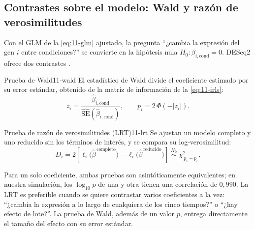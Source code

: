 \subsection{Contrastes sobre el modelo: Wald y razón de verosimilitudes}

Con el GLM de la \cref{eq:11-glm} ajustado, la pregunta ``¿cambia la expresión del gen $i$ entre condiciones?'' se convierte en la hipótesis nula $H_0:\beta_{i,\mathrm{cond}}=0$. DESeq2 ofrece dos contrastes \parencite{c11-love2014}.

\begin{definicion}{Prueba de Wald}{11-wald}
El estadístico de Wald divide el coeficiente estimado por su error estándar, obtenido de la matriz de información de la \cref{eq:11-irls}:
\begin{equation}\label{eq:11-wald}
z_i=\frac{\hat\beta_{i,\mathrm{cond}}}{\widehat{\mathrm{SE}}(\hat\beta_{i,\mathrm{cond}})},\qquad p_i=2\,\Phi\!\left(-|z_i|\right).
\end{equation}
\end{definicion}

\begin{simbolos}
\end{simbolos}

\begin{definicion}{Prueba de razón de verosimilitudes (LRT)}{11-lrt}
Se ajustan un modelo completo y uno reducido sin los términos de interés, y se compara su log-verosimilitud:
\begin{equation}\label{eq:11-lrt}
D_i=2\left[\ell_i\big(\hat\beta^{\,\mathrm{completo}}\big)-\ell_i\big(\hat\beta^{\,\mathrm{reducido}}\big)\right]\;\overset{H_0}{\sim}\;\chi^2_{\,p_c-p_r}.
\end{equation}
\end{definicion}

\begin{simbolos}
\end{simbolos}

Para un solo coeficiente, ambas pruebas son asintóticamente equivalentes; en nuestra simulación, los $\log_{10}p$ de una y otra tienen una correlación de $0{,}990$. La LRT es preferible cuando se quiere contrastar varios coeficientes a la vez: ``¿cambia la expresión a lo largo de cualquiera de los cinco tiempos?'' o ``¿hay efecto de lote?''. La prueba de Wald, además de un valor $p$, entrega directamente el tamaño del efecto con su error estándar.

